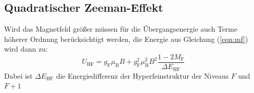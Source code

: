 \subsection{Quadratischer Zeeman-Effekt}
\label{sec:quadr}
Wird das Magnetfeld größer müssen für die Übergangsenergie auch Terme höherer Ordnung berücksichtigt werden, die Energie aus Gleichung (\ref{eqn:mf}) wird dann zu:
\begin{equation}
  \label{eqn:quadra}
  U_\mathrm{HF}=g_\mathrm{F}\mu_\mathrm{B}B+g_\mathrm{F}^2\mu_\mathrm{B}^2B^2\dfrac{1-2M_\mathrm{F}}{\Delta E_\mathrm{HF}}
\end{equation}
Dabei ist $\Delta E_\mathrm{HF}$ die Energiedifferenz der Hyperfeinstruktur der Niveaus $F$ und $F+1$
